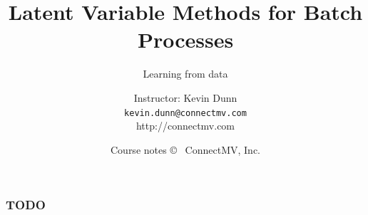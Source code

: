 \documentclass[handout, 12pt]{beamer}
\title[]{Latent Variable Methods for Batch Processes}
\subtitle[]{Learning from data}
\author[]{Instructor: Kevin Dunn \\{\tt kevin.dunn@connectmv.com}\\ http://connectmv.com}
\institute[]{}
\date[]{Course notes \copyright~ ConnectMV, Inc. \\ \vspace{1cm}{\footnotesize Presented at GSK, Mississauga, February 2011}}
\begin{document}
\begin{frame}
\titlepage
\end{frame}

\begin{frame}\frametitle{TODO}



\end{frame}
\end{document}
